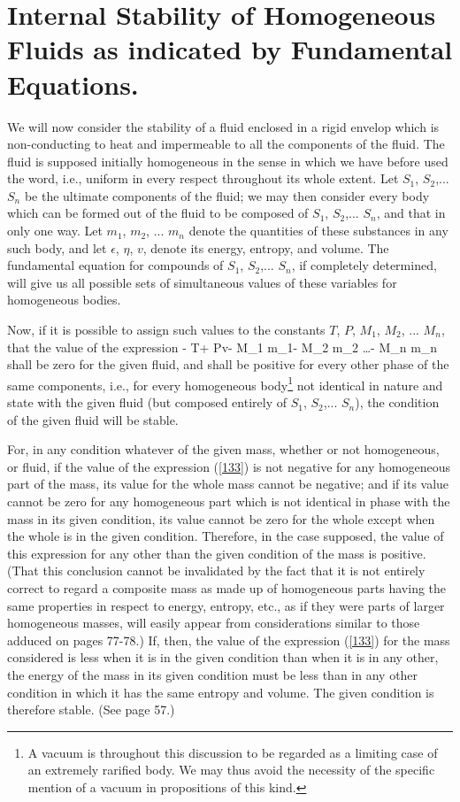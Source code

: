 \documentclass[12pt]{article}
\begin{document}
\section{Internal Stability of Homogeneous Fluids as indicated by Fundamental Equations.}
We will now consider the stability of a fluid enclosed in a rigid envelop which is non-conducting to heat and impermeable to all the components of the fluid. The fluid is supposed initially homogeneous in the sense in which we have before used the word, i.e., uniform in every respect throughout its whole extent. Let $S_1$, $S_2$,... $S_n$ be the ultimate components of the fluid; we may then consider every body which can be formed out of the fluid to be composed of $S_1$, $S_2$,... $S_n$, and that in only one way. Let $m_1$, $m_2$, ... $m_n$ denote the quantities of these substances in any such body, and let $\epsilon$, $\eta$, $v$, denote its energy, entropy, and volume. The fundamental equation for compounds of $S_1$, $S_2$,... $S_n$, if completely determined, will give us all possible sets of simultaneous values of these variables for homogeneous bodies.


Now, if it is possible to assign such values to the constants $T$, $P$,
$M_1$, $M_2$, ... $M_n$, that the value of the expression
\eqs \epsilon - T\eta + Pv- M_1 m_1- M_2 m_2 \dots - M_n m_n \label{133}\eqe 
shall be zero for the given fluid, and shall be positive for every other phase of the same components, i.e., for every homogeneous body\footnote{A vacuum is throughout this discussion to be regarded as a limiting case of an extremely rarified body. We may thus avoid the necessity of the specific mention of a vacuum in propositions of this kind.} not identical in nature and state with the given fluid (but composed entirely of $S_1$, $S_2$,... $S_n$), the condition of the given fluid will be stable.


For, in any condition whatever of the given mass, whether or not homogeneous, or fluid, if the value of the expression (\ref{133}) is not negative for any homogeneous part of the mass, its value for the whole mass cannot be negative; and if its value cannot be zero for any homogeneous part which is not identical in phase with the mass in its given condition, its value cannot be zero for the whole except when the whole is in the given condition. Therefore, in the case supposed, the value of this expression for any other than the given condition of the mass is positive. (That this conclusion cannot be invalidated by the fact that it is not entirely correct to regard a composite mass as made up of homogeneous parts having the same properties in respect to energy, entropy, etc., as if they were parts of larger homogeneous masses, will easily appear from considerations similar to those adduced on pages 77-78.) If, then, the value of the expression (\ref{133}) for the mass considered is less when it is in the given condition than when it is in any other, the energy of the mass in its given condition must be less than in any other condition in which it has the same entropy and volume. The given condition is therefore stable. (See page 57.)
\end{document}
